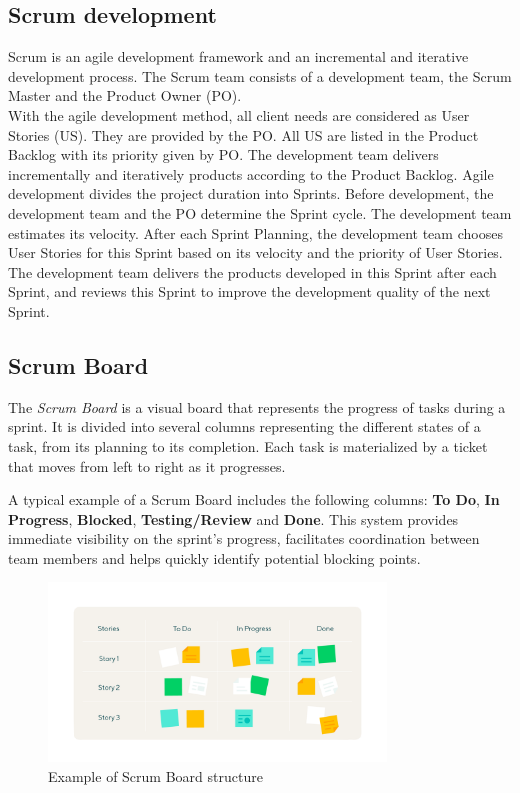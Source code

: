 \subsection{Scrum development}
Scrum is an agile development framework and an incremental and iterative development process. The Scrum team consists of a development team, the Scrum Master and the Product Owner (PO).\\

\noindent
With the agile development method, all client needs are considered as User Stories (US). They are provided by the PO. All US are listed in the Product Backlog with its priority given by PO. The development team delivers incrementally and iteratively products according to the Product Backlog. Agile development divides the project duration into Sprints. Before development, the development team and the PO determine the Sprint cycle. The development team estimates its velocity. After each Sprint Planning, the development team chooses User Stories for this Sprint based on its velocity and the priority of User Stories. The development team delivers the products developed in this Sprint after each Sprint, and reviews this Sprint to improve the development quality of the next Sprint.

\subsection{Scrum Board}

The \textit{Scrum Board} is a visual board that represents the progress of tasks during a sprint. 
It is divided into several columns representing the different states of a task, from its planning to its completion. 
Each task is materialized by a ticket that moves from left to right as it progresses.  

\noindent
A typical example of a Scrum Board includes the following columns: 
\textbf{To Do}, 
\textbf{In Progress}, 
\textbf{Blocked}, 
\textbf{Testing/Review} and 
\textbf{Done}. 
This system provides immediate visibility on the sprint's progress, facilitates coordination between team members and helps quickly identify potential blocking points.  

\begin{figure}[H]
    \centering
    \includegraphics[width=0.8\textwidth]{images/scrum_board.png}
    \caption{Example of Scrum Board structure}
\end{figure}

